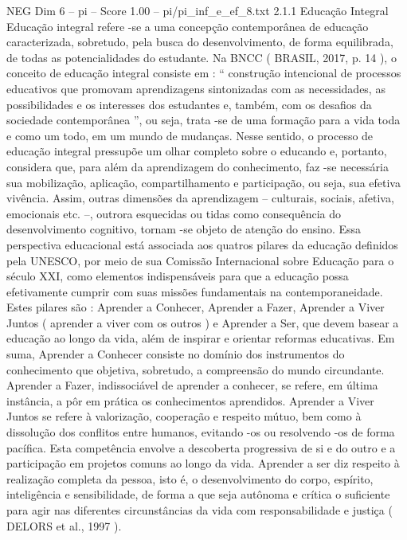 \begin{textsample}{NEG Dim 6 – pi – Score 1.00 – pi/pi\_inf\_e\_ef\_8.txt}  \label{ex:f6_neg_094}
2.1.1 Educação Integral Educação integral refere -se a uma concepção contemporânea de educação caracterizada, sobretudo, pela busca do desenvolvimento, de forma equilibrada, de todas as potencialidades do estudante.
Na BNCC ( BRASIL, 2017, p. 14 ), o conceito de educação integral consiste em : “ construção intencional de processos educativos que promovam aprendizagens sintonizadas com as necessidades, as possibilidades e os interesses dos estudantes e, também, com os desafios da sociedade contemporânea ”, ou seja, trata -se de uma formação para a vida toda e como um todo, em um mundo de mudanças.
Nesse sentido, o processo de educação integral pressupõe um olhar completo sobre o educando e, portanto, considera que, para além da aprendizagem do conhecimento, faz -se necessária sua mobilização, aplicação, compartilhamento e participação, ou seja, sua efetiva vivência.
Assim, outras dimensões da aprendizagem – culturais, sociais, afetiva, emocionais etc. –, outrora esquecidas ou tidas como consequência do desenvolvimento cognitivo, tornam -se objeto de atenção do ensino.
Essa perspectiva educacional está associada aos quatros pilares da educação definidos pela UNESCO, por meio de sua Comissão Internacional sobre Educação para o século XXI, como elementos indispensáveis para que a educação possa efetivamente cumprir com suas missões fundamentais na contemporaneidade.
Estes pilares são : Aprender a Conhecer, Aprender a Fazer, Aprender a Viver Juntos ( aprender a viver com os outros ) e Aprender a Ser, que devem basear a educação ao longo da vida, além de inspirar e orientar reformas educativas.
Em suma, Aprender a Conhecer consiste no domínio dos instrumentos do conhecimento que objetiva, sobretudo, a compreensão do mundo circundante.
Aprender a Fazer, indissociável de aprender a conhecer, se refere, em última instância, a pôr em prática os conhecimentos aprendidos.
Aprender a Viver Juntos se refere à valorização, cooperação e respeito mútuo, bem como à dissolução dos conflitos entre humanos, evitando -os ou resolvendo -os de forma pacífica.
Esta competência envolve a descoberta progressiva de si e do outro e a participação em projetos comuns ao longo da vida.
Aprender a ser diz respeito à realização completa da pessoa, isto é, o desenvolvimento do corpo, espírito, inteligência e sensibilidade, de forma a que seja autônoma e crítica o suficiente para agir nas diferentes circunstâncias da vida com responsabilidade e justiça ( DELORS et al., 1997 ).

\end{textsample}
